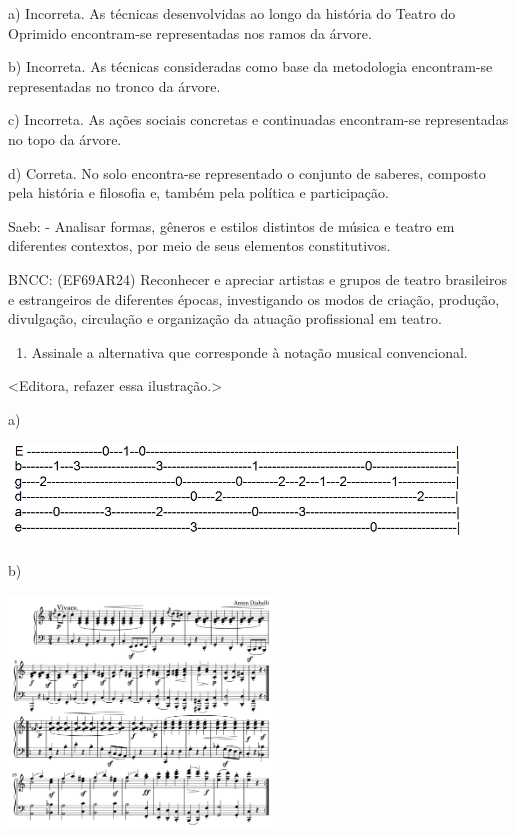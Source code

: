 \begin{escolha}
{{{{{{{{a) Incorreta. As técnicas desenvolvidas ao longo da história do Teatro
do Oprimido encontram-se representadas nos ramos da árvore.

b) Incorreta. As técnicas consideradas como base da metodologia
encontram-se representadas no tronco da árvore.

c) Incorreta. As ações sociais concretas e continuadas encontram-se
representadas no topo da árvore.

d) Correta. No solo encontra-se representado o conjunto de saberes,
composto pela história e filosofia e, também pela política e
participação.

Saeb: - Analisar formas, gêneros e estilos distintos de música e teatro
em diferentes contextos, por meio de seus elementos constitutivos.

BNCC: (EF69AR24) Reconhecer e apreciar artistas e grupos de teatro
brasileiros e estrangeiros de diferentes épocas, investigando os modos
de criação, produção, divulgação, circulação e organização da atuação
profissional em teatro.

\begin{enumerate}
\def\labelenumi{\arabic{enumi}.}
\item
  Assinale a alternativa que corresponde à notação musical convencional.
\end{enumerate}

\textless{}Editora, refazer essa ilustração.\textgreater{}

a)

\includegraphics[width=4.75000in,height=1.03125in]{media/image31.jpeg}

b)

\includegraphics[width=2.76042in,height=2.43750in]{media/image32.png}

}}}}}}}}
\end{escolha}
